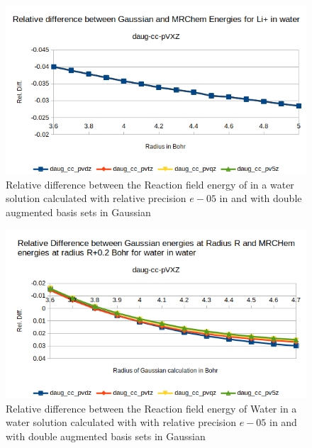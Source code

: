 \documentclass[../master_thesis.tex]{subfiles}
\begin{document}
\begin{figure}[h!]
  \centering
  \includegraphics[width=\linewidth]{img/lipdaugreldiff.png}
  \caption{Relative difference between the Reaction field energy of in a water solution calculated with relative precision $e-05$ in \mrchem
  and with double augmented basis sets in Gaussian}
  \label{fig:lipreldiffdaug}
\end{figure}

\begin{figure}[h!]
  \centering
    \includegraphics[width=\linewidth]{img/watdaugreldiff02.png}
  \caption{Relative difference between the Reaction field energy of Water in a water solution calculated with with relative precision $e-05$ in \mrchem
  and with double augmented basis sets in Gaussian}
  \label{fig:watreldiff02daug}
\end{figure}
\end{document}
